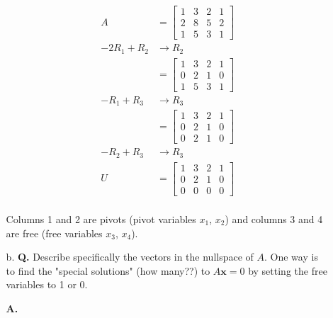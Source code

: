 \documentclass[main.tex]{subfiles}
\begin{document}
\begin{enumerate}
\begin{enumerate}
    $$
    \begin{aligned}
    A&=\left[\begin{array}{llll}
    1 & 3 & 2 & 1 \\
    2 & 8 & 5 & 2 \\
    1 & 5 & 3 & 1
    \end{array}\right]\\
    -2R_1 + R_2 & \rightarrow R_2\\
    &=\left[\begin{array}{llll}
    1 & 3 & 2 & 1 \\
    0 & 2 & 1 & 0 \\
    1 & 5 & 3 & 1
    \end{array}\right]\\
    -R_1 + R_3 & \rightarrow R_3\\
    &=\left[\begin{array}{llll}
    1 & 3 & 2 & 1 \\
    0 & 2 & 1 & 0 \\
    0 & 2 & 1 & 0
    \end{array}\right]\\
    -R_2 + R_3 & \rightarrow R_3\\
    U &=\left[\begin{array}{llll}
    1 & 3 & 2 & 1 \\
    0 & 2 & 1 & 0 \\
    0 & 0 & 0 & 0
    \end{array}\right]\\
    \end{aligned}
    $$
    
    Columns 1 and 2 are pivots (pivot variables $x_1$, $x_2$) and columns 3 and 4 are free (free variables $x_3$, $x_4$).
    
    \item[b.] \textbf{Q.} Describe specifically the vectors in the nullspace of $A$. One way is to find the "special solutions" (how many??) to $A \boldsymbol{x}=0$ by setting the free variables to 1 or 0. 
    
    \textbf{A.}
    

\end{enumerate}
\end{enumerate}
\end{document}
